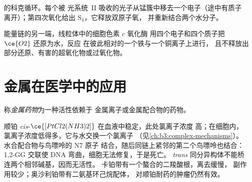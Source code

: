 \begin{omfigure}

{\small {}的科克循环。每个被
光系统~II 吸收的光子从锰簇中移去一个电子（途中有质子
离开）；第四次氧化给出 $\mathrm S_4$，它释放双原子氧，
并重新结合两个水分子。}
\end{omfigure}

能量链的另一端，线粒体中的细胞色素 $c$ 氧化酶
用四个电子和四个质子把 $\ce{O2}$ 还原为水，反应
在彼此相对的一个铁与一个铜离子上进行，
且不释放出部分还原、有害的超氧化物或过氧化物。

\section{金属在医学中的应用}

\begin{definition}[金属药物]\label{def:b3:bioinorganic:metallodrug}
称\emph{金属药物}为一种活性依赖于
金属离子或金属配合物的药物。
\end{definition}

顺铂 \textit{cis}-$\ce{[PtCl2(NH3)2]}$ 在血液中稳定，此处氯离子浓度
高；在细胞内，氯离子浓度低得多，它与水交换一个氯离子
（见\cref{ch:b3:complex-mechanisms}）。水合配合物与鸟嘌呤的 N7 原子
结合，随后同链上紧邻的第二个鸟嘌呤也结合：1,2-GG
交联使 DNA 弯曲，细胞无法修复，于是死亡。
\textit{trans} 同分异构体不能桥连两个相邻碱基，因而无活性。
卡铂带有一个螯合的二羧酸根，离去缓慢，
副作用较少；奥沙利铂带有二氨基环己烷配体，
对顺铂耐药的肿瘤仍然有效。

